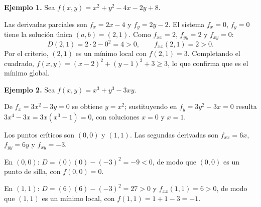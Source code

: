 \textbf{Ejemplo 1.} Sea $f(x, y) = x^2 + y^2 - 4x - 2y + 8$.

Las derivadas parciales son $f_x = 2x - 4$ y $f_y = 2y - 2$. El sistema $f_x = 0$, $f_y = 0$ tiene la solución única $(a, b) = (2, 1)$. Como $f_{xx} = 2$, $f_{yy} = 2$ y $f_{xy} = 0$:
\[
D(2,1) = 2 \cdot 2 - 0^2 = 4 > 0, \qquad f_{xx}(2,1) = 2 > 0.
\]
Por el criterio, $(2, 1)$ es un mínimo local con $f(2, 1) = 3$. Completando el cuadrado, $f(x,y) = (x-2)^2 + (y-1)^2 + 3 \geq 3$, lo que confirma que es el mínimo global.

\begin{center}
\shorthandoff{>}
\end{center}

\textbf{Ejemplo 2.} Sea $f(x, y) = x^3 + y^3 - 3xy$.

De $f_x = 3x^2 - 3y = 0$ se obtiene $y = x^2$; sustituyendo en $f_y = 3y^2 - 3x = 0$ resulta $3x^4 - 3x = 3x(x^3-1) = 0$, con soluciones $x = 0$ y $x = 1$.

Los puntos críticos son $(0, 0)$ y $(1, 1)$. Las segundas derivadas son $f_{xx} = 6x$, $f_{yy} = 6y$ y $f_{xy} = -3$.

En $(0, 0)$: $D = (0)(0) - (-3)^2 = -9 < 0$, de modo que $(0, 0)$ es un punto de silla, con $f(0,0) = 0$.

En $(1, 1)$: $D = (6)(6) - (-3)^2 = 27 > 0$ y $f_{xx}(1,1) = 6 > 0$, de modo que $(1, 1)$ es un mínimo local, con $f(1,1) = 1 + 1 - 3 = -1$.

